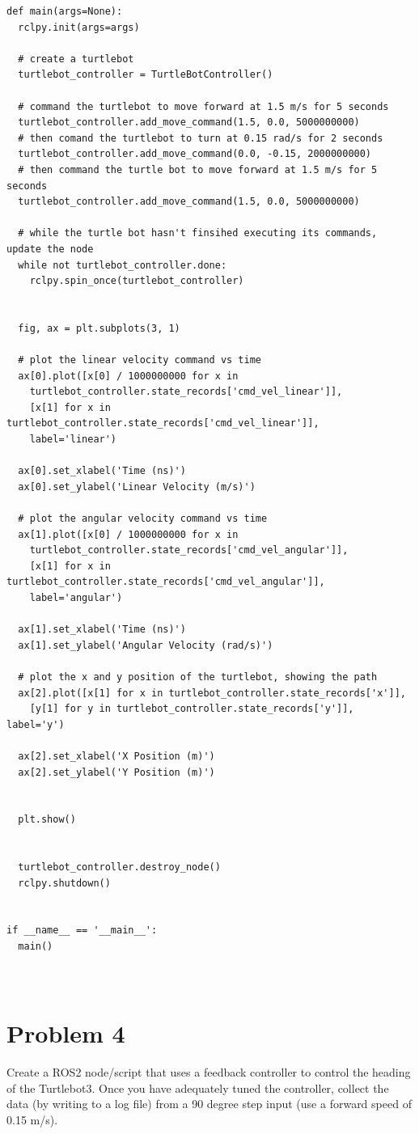 \documentclass{article}
\begin{document}
\begin{verbatim}
def main(args=None):
  rclpy.init(args=args)

  # create a turtlebot
  turtlebot_controller = TurtleBotController()

  # command the turtlebot to move forward at 1.5 m/s for 5 seconds
  turtlebot_controller.add_move_command(1.5, 0.0, 5000000000)
  # then comand the turtlebot to turn at 0.15 rad/s for 2 seconds
  turtlebot_controller.add_move_command(0.0, -0.15, 2000000000)
  # then command the turtle bot to move forward at 1.5 m/s for 5 seconds
  turtlebot_controller.add_move_command(1.5, 0.0, 5000000000)

  # while the turtle bot hasn't finsihed executing its commands, update the node
  while not turtlebot_controller.done:
    rclpy.spin_once(turtlebot_controller)
  
  
  fig, ax = plt.subplots(3, 1)

  # plot the linear velocity command vs time
  ax[0].plot([x[0] / 1000000000 for x in
    turtlebot_controller.state_records['cmd_vel_linear']], 
    [x[1] for x in turtlebot_controller.state_records['cmd_vel_linear']],
    label='linear')

  ax[0].set_xlabel('Time (ns)')
  ax[0].set_ylabel('Linear Velocity (m/s)')

  # plot the angular velocity command vs time
  ax[1].plot([x[0] / 1000000000 for x in 
    turtlebot_controller.state_records['cmd_vel_angular']],
    [x[1] for x in turtlebot_controller.state_records['cmd_vel_angular']],
    label='angular')

  ax[1].set_xlabel('Time (ns)')
  ax[1].set_ylabel('Angular Velocity (rad/s)')

  # plot the x and y position of the turtlebot, showing the path
  ax[2].plot([x[1] for x in turtlebot_controller.state_records['x']], 
    [y[1] for y in turtlebot_controller.state_records['y']], label='y')
  
  ax[2].set_xlabel('X Position (m)')
  ax[2].set_ylabel('Y Position (m)')
  

  plt.show()
  

  turtlebot_controller.destroy_node()
  rclpy.shutdown()


if __name__ == '__main__':
  main()



\end{verbatim}

\section*{Problem 4}
Create a ROS2 node/script that uses a feedback controller to control the heading of the Turtlebot3. 
Once you have adequately tuned the controller, collect the data (by writing to a log file) from a 90 
degree step input (use a forward speed of 0.15 m/s).
\end{document}
